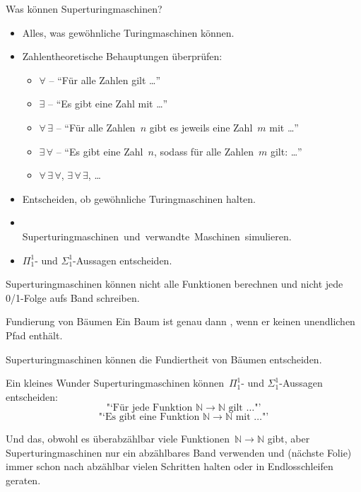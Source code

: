 \documentclass[12pt,compress,ngerman,utf8,t]{beamer}
\renewcommand{\_}{\mathpunct{.}\,}
\newcommand{\NN}{\mathbb{N}}
\newcommand{\hil}[1]{{\usebeamercolor[fg]{item}{\textbf{#1}}}}
\begin{document}
\begin{frame}{Was können Superturingmaschinen?}
  \begin{itemize}
    \item Alles, was gewöhnliche Turingmaschinen können.
    \item Zahlentheoretische Behauptungen überprüfen:
      \begin{itemize}
        \item $\forall$ -- "`Für alle Zahlen gilt \ldots"'    %
        \item $\exists$ -- "`Es gibt eine Zahl mit \ldots"'   %
        \item $\forall\,\exists$ -- "`Für alle Zahlen~$n$
        gibt es jeweils eine Zahl~$m$ mit \ldots"'            %
        \item $\exists\,\forall$ -- "`Es gibt eine Zahl~$n$,
        sodass für alle Zahlen~$m$ gilt: \ldots"'             %
        \item $\forall\,\exists\,\forall$,                    %
        $\exists\,\forall\,\exists$, \ldots
      \end{itemize}
    \item Entscheiden, ob gewöhnliche Turingmaschinen halten.
    \item \ \\[-1.2em]\mbox{Superturingmaschinen und verwandte Maschinen simulieren.}
    \item $\Pi_1^1$- und $\Sigma_1^1$-Aussagen entscheiden.
  \end{itemize}
  \pause

  \hil{Aber:} Superturingmaschinen können nicht alle Funktionen berechnen
  und nicht jede 0/1-Folge aufs Band schreiben.
\end{frame}

\begin{frame}{Fundierung von Bäumen}
  Ein Baum ist genau dann \hil{fundiert}, wenn er keinen unendlichen Pfad enthält.

  \begin{center}
    \scalebox{0.4}{}
  \end{center}

  Superturingmaschinen können die Fundiertheit von Bäumen entscheiden.
\end{frame}

\begin{frame}{Ein kleines Wunder}
  Superturingmaschinen können~$\Pi_1^1$- und $\Sigma_1^1$-Aussagen entscheiden:
  \[ \text{"`Für jede Funktion~$\NN \to \NN$ gilt \ldots"'} \]
  \[ \text{"`Es gibt eine Funktion~$\NN \to \NN$ mit \ldots"'} \]

  \vspace*{0.5em}
  Und das, obwohl es überabzählbar viele Funktionen~$\NN \to \NN$ gibt, aber
  Superturingmaschinen nur ein abzählbares Band verwenden und (nächste
  Folie) immer schon nach abzählbar vielen Schritten halten
  oder in Endlosschleifen geraten.
\end{frame}
\end{document}
